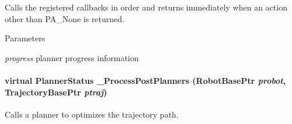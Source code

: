 Calls the registered callbacks in order and returns immediately when an action other than PA\_\-None is returned. 


\begin{DoxyParams}{Parameters}
\item[{\em progress}]planner progress information \end{DoxyParams}
\hypertarget{classOpenRAVE_1_1PlannerBase_a0e418a8cb5f9392ed0db1f1f9ec9d8ce}{
\paragraph[{\_\-ProcessPostPlanners}]{\setlength{\rightskip}{0pt plus 5cm}virtual {\bf PlannerStatus} \_\-ProcessPostPlanners (RobotBasePtr {\em probot}, \/  TrajectoryBasePtr {\em ptraj})}\hfill}
\label{classOpenRAVE_1_1PlannerBase_a0e418a8cb5f9392ed0db1f1f9ec9d8ce}


Calls a planner to optimizes the trajectory path. 

